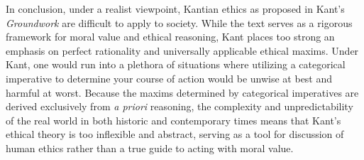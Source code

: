\documentclass[12pt]{article}
\newcommand{\bibent}{\noindent \hangindent 40pt}
\newenvironment{workscited}{\newpage \begin{center} Works Cited \end{center}}{\newpage }
\begin{document}
\begin{flushleft}
In conclusion, under a realist viewpoint, Kantian ethics as proposed in Kant's \textit{Groundwork} are difficult to apply to society. While the text serves as a rigorous framework for moral value and ethical reasoning, Kant places too strong an emphasis on perfect rationality and universally applicable ethical maxims. Under Kant, one would run into a plethora of situations where utilizing a categorical imperative to determine your course of action would be unwise at best and harmful at worst. Because the maxims determined by categorical imperatives are derived exclusively from \textit{a priori} reasoning, the complexity and unpredictability of the real world in both historic and contemporary times means that Kant's ethical theory is too inflexible and abstract, serving as a tool for discussion of human ethics rather than a true guide to acting with moral value.




















\end{flushleft}
\end{document}
